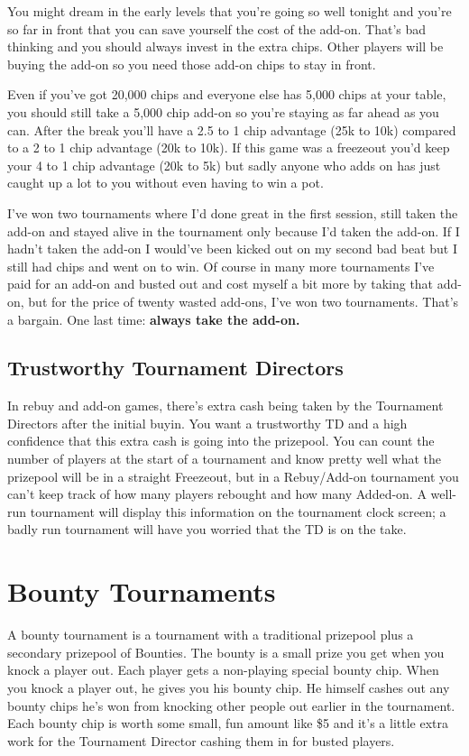 You might dream in the early levels that you're going so well
tonight and you're so far in front that you can save yourself
the cost of the add-on. That's bad thinking and you should always
invest in the extra chips. Other players will be buying the add-on
so you need those add-on chips to stay in front.

Even if you've got 20,000 chips and everyone else has 5,000 chips at
your table, you should still take a 5,000 chip add-on so you're staying
as far ahead as you can. After the break you'll have a 2.5 to 1 chip
advantage (25k to 10k) compared to a 2 to 1 chip advantage (20k to 10k).
If this game was a freezeout you'd keep your 4 to 1 chip advantage
(20k to 5k) but sadly anyone who adds on has just caught up a lot to you
without even having to win a pot.

I've won two tournaments where I'd done great in the first session,
still taken the add-on and stayed alive in the tournament only because
I'd taken the add-on. If I hadn't taken the add-on I would've been
kicked out on my second bad beat but I still had chips
and went on to win. Of course in many more tournaments
I've paid for an add-on and busted out and cost myself a bit more by
taking that add-on, but for the price of twenty wasted add-ons, I've won two
tournaments. That's a bargain. One last time: \textbf{always take the add-on.}

\subsection{Trustworthy Tournament Directors}

In rebuy and add-on games, there's extra cash being taken by
the Tournament Directors after the initial buyin. You want
a trustworthy TD and a high confidence that this extra cash is
going into the prizepool. You can count the number of players
at the start of a tournament and know pretty well what the prizepool
will be in a straight Freezeout, but in a Rebuy/Add-on tournament
you can't keep track of how many players rebought and how
many Added-on. A well-run tournament will display this
information on the tournament clock screen; a badly run tournament
will have you worried that the TD is on the take.

\section{Bounty Tournaments}

A bounty tournament is a tournament with a traditional prizepool
plus a secondary prizepool of Bounties. The bounty
is a small prize you get when you knock a player out.
Each player gets a non-playing special bounty chip.
When you knock a player out, he gives you his bounty chip.
He himself cashes out any bounty chips he's won from knocking
other people out earlier in the tournament. Each bounty chip is worth
some small, fun amount like \$5 and it's a little extra work for the
Tournament Director cashing them in for busted players.

